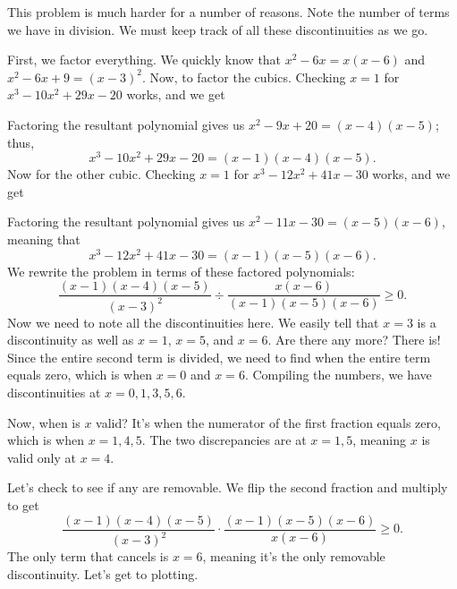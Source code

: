 \documentclass[lang=en,11pt]{elegantbook}
\begin{document}
\begin{solution}
This problem is much harder for a number of reasons.  Note the number of terms we have in division. We must keep track of all these discontinuities as we go.

First, we factor everything.  We quickly know that $x^2-6x=x(x-6)$ and $x^2-6x+9=(x-3)^2$.  Now, to factor the cubics.  Checking $x=1$ for $x^3-10x^2+29x-20$ works, and we get


\noindent Factoring the resultant polynomial gives us $x^2-9x+20=(x-4)(x-5)$; thus, $$x^3-10x^2+29x-20=(x-1)(x-4)(x-5).$$ Now for the other cubic.  Checking $x=1$ for $x^3-12x^2+41x-30$ works, and we get


\noindent Factoring the resultant polynomial gives us $x^2-11x-30=(x-5)(x-6)$, meaning that $$x^3-12x^2+41x-30=(x-1)(x-5)(x-6).$$
We rewrite the problem in terms of these factored polynomials: $$\dfrac{(x-1)(x-4)(x-5)}{(x-3)^2}\div\dfrac{x(x-6)}{(x-1)(x-5)(x-6)}\geq 0.$$
Now we need to note all the discontinuities here.  We easily tell that $x=3$ is a discontinuity as well as $x=1$, $x=5$, and $x=6$.  Are there any more? There is! Since the entire second term is divided, we need to find when the entire term equals zero, which is when $x=0$ and $x=6$. Compiling the numbers, we have discontinuities at $x=0,1,3,5,6$.

Now, when is $x$ valid? It's when the numerator of the first fraction equals zero, which is when $x=1,4,5$. The two discrepancies are at $x=1,5$, meaning $x$ is valid only at $x=4$.

Let's check to see if any are removable.  We flip the second fraction and multiply to get $$\dfrac{(x-1)(x-4)(x-5)}{(x-3)^2}\cdot\dfrac{(x-1)(x-5)(x-6)}{x(x-6)}\geq 0.$$ The only term that cancels is $x=6$, meaning it's the only removable discontinuity. Let's get to plotting.

\begin{figure}[!h]
    \centering
\end{figure}


\end{solution}
\end{document}
